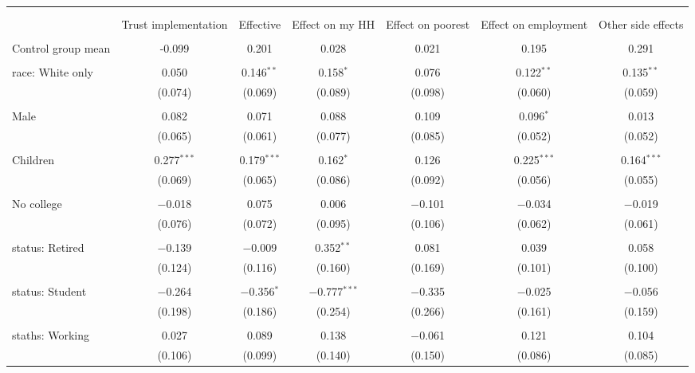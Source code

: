 
\begin{tabular}{@{\extracolsep{5pt}}lcccccc} 
\\[-1.8ex]\hline 
\hline \\[-1.8ex] 
\\[-1.8ex] & Trust implementation & Effective & Effect on my HH & Effect on poorest & Effect on employment & Other side effects \\ 
\hline \\[-1.8ex] 
 Control group mean & -0.099 & 0.201 & 0.028 & 0.021 & 0.195 & 0.291  \\ \hline \\[-1.8ex] race: White only & 0.050 & 0.146$^{**}$ & 0.158$^{*}$ & 0.076 & 0.122$^{**}$ & 0.135$^{**}$ \\ 
  & (0.074) & (0.069) & (0.089) & (0.098) & (0.060) & (0.059) \\ 
  & & & & & & \\ 
 Male & 0.082 & 0.071 & 0.088 & 0.109 & 0.096$^{*}$ & 0.013 \\ 
  & (0.065) & (0.061) & (0.077) & (0.085) & (0.052) & (0.052) \\ 
  & & & & & & \\ 
 Children & 0.277$^{***}$ & 0.179$^{***}$ & 0.162$^{*}$ & 0.126 & 0.225$^{***}$ & 0.164$^{***}$ \\ 
  & (0.069) & (0.065) & (0.086) & (0.092) & (0.056) & (0.055) \\ 
  & & & & & & \\ 
 No college & $-$0.018 & 0.075 & 0.006 & $-$0.101 & $-$0.034 & $-$0.019 \\ 
  & (0.076) & (0.072) & (0.095) & (0.106) & (0.062) & (0.061) \\ 
  & & & & & & \\ 
 status: Retired & $-$0.139 & $-$0.009 & 0.352$^{**}$ & 0.081 & 0.039 & 0.058 \\ 
  & (0.124) & (0.116) & (0.160) & (0.169) & (0.101) & (0.100) \\ 
  & & & & & & \\ 
 status: Student & $-$0.264 & $-$0.356$^{*}$ & $-$0.777$^{***}$ & $-$0.335 & $-$0.025 & $-$0.056 \\ 
  & (0.198) & (0.186) & (0.254) & (0.266) & (0.161) & (0.159) \\ 
  & & & & & & \\ 
 staths: Working & 0.027 & 0.089 & 0.138 & $-$0.061 & 0.121 & 0.104 \\ 
  & (0.106) & (0.099) & (0.140) & (0.150) & (0.086) & (0.085) \\ 

\end{tabular}
